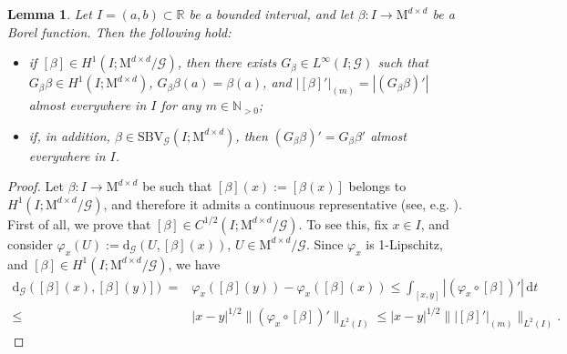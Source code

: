 \documentclass[a4paper,reqno]{amsart}
\newcommand\R{\mathbb{R}}
\newcommand\N{\mathbb{N}}
\newcommand{\SBVG}{\mathrm{SBV}_{\mathcal{G}}}
\newcommand{\dG}{\mathrm{d}_{\G}}
\newcommand\dt{{\,\mathrm{d}t}}
\newtheorem{lemma}[definition]{Lemma}
\theoremstyle{remark}
\newcommand{\G}{\mathcal{G}}
\newcommand{\Mno}{\mathrm{M}^{d\times d}}
\numberwithin{equation}{section}
\begin{document}
\begin{lemma}\label{l:clean}
Let $I=(a,b)\subset \R$ be a bounded interval, and let $\beta: I\to \Mno$ be a Borel function. Then the following hold:
\begin{itemize}
\item[i)] if  $[\beta] \in H^1(I;\Mno/\G)$, then there exists $G_\beta \in L^\infty(I;\G)$ such that $G_\beta \beta \in H^1(I; \Mno)$,
$G_\beta \beta(a)=\beta(a)$, and
$|[\beta]'|_{(m)}=| (G_\beta\beta)'|$ almost everywhere in $I$ for any $m\in\N_{>0}$;
\item[ii)]  if, in addition, $\beta\in \SBVG(I;\Mno)$,  then $(G_\beta\beta)'=G_\beta\beta'$ almost everywhere in $I$.
\end{itemize}
\end{lemma}

\begin{proof}
Let $\beta: I\to \Mno$ be such that $[\beta](x):=[\beta(x)]$ belongs to $H^1(I;\Mno/\G)$, and therefore it admits a continuous representative (see, e.g. \cite[Remark 2.2]{Amb90SBVX}).
First of all, we prove that $[\beta]\in  C^{1/2}(I;\Mno/\G)$. To see this, fix $x\in I$, and consider
$\varphi_x(U):=\dG(U,[\beta](x))$, $U\in \Mno/\G$. Since $\varphi_x$ is 1-Lipschitz, and $[\beta] \in H^1(I;\Mno/\G)$,
we have
\begin{equation*}\begin{split}
 \dG([\beta](x),[\beta](y)])
 =&\varphi_x([\beta](y))-\varphi_x([\beta](x))
 \le \int_{[x,y]} |(\varphi_x\circ[\beta])'| \dt
 \\
 \le& |x-y|^{1/2} \|(\varphi_x\circ[\beta])'\|_{L^2(I)}
\le |x-y|^{1/2} \| \left|[\beta]'\right|_{(m)}\|_{L^2(I)}.
\end{split}\end{equation*}




\end{proof}
\end{document}
